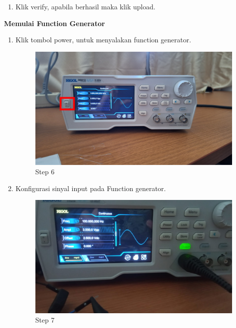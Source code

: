 \begin{center}
\begin{enumerate}
		\item Klik verify, apabila berhasil maka klik upload.
	\end{enumerate}
	
	\textbf{Memulai Function Generator}
	\begin{enumerate}
		\item Klik tombol power, untuk menyalakan function generator.
		\begin{figure}[H]
			\centering
			\includegraphics[width=0.8\linewidth]{P4/img/per1/step 6.png}
			\caption{Step 6}
			\label{fig:Step 6(Step 6)}
		\end{figure}

		\item Konfigurasi sinyal input pada Function generator.
		\begin{figure}[H]
			\centering
			\includegraphics[width=0.8\linewidth]{P4/img/per1/step 7.png}
			\caption{Step 7}
			\label{fig:Step 7(Step 7)}
		\end{figure}
	\end{enumerate}


\end{center}
